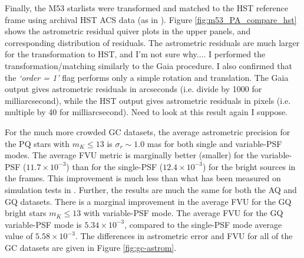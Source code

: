 \documentclass[]{spie}  %
\begin{document}
Finally, the M53 starlists were transformed and matched to the HST reference frame using archival HST ACS data (as in \cite{service:2016a}). Figure \ref{fig:m53_PA_compare_hst} shows the astrometric residual quiver plots in the upper panels, and corresponding distribution of residuals. The astrometric residuals are much larger for the transformation to HST, and I'm not sure why.... I performed the transformation/matching similarly to the Gaia procedure. I also confirmed that the \textit{`order = 1'} flag performs only a simple rotation and translation. The Gaia output gives astrometric residuals in arcseconds (i.e. divide by 1000 for milliarcsecond), while the HST output gives astrometric residuals in pixels (i.e. multiple by 40 for milliarcsecond). Need to look at this result again I suppose.


\indent For the much more crowded GC datasets, the average astrometric precision for the PQ stars with $m_{K} \leq 13$ is $\sigma_{{r}}{\sim}1.0$ mas for both single and variable-PSF modes. The average FVU metric is marginally better (smaller) for the variable-PSF ($11.7\times10^{-3}$) than for the single-PSF ($12.4\times10^{-3}$) for the bright sources in the frames. This improvement is much less than what has been measured on simulation tests in \cite{Turri:inprep}. Further, the results are much the same for both the AQ and GQ datasets. There is a marginal improvement in the average FVU for the GQ bright stars $m_{K} \leq 13$ with variable-PSF mode. The average FVU for the GQ variable-PSF mode is $5.34\times10^{-3}$, compared to the single-PSF mode average value of $5.58\times10^{-3}$. The differences in astrometric error and FVU for all of the GC datasets are given in Figure \ref{fig:gc-astrom}.

\end{document}
